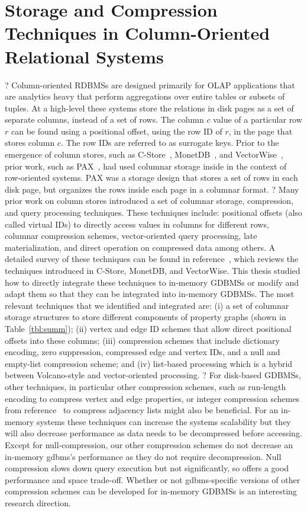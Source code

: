 \section{Storage and Compression Techniques in Column-Oriented Relational Systems}
\label{sec:column-stores-overview}
?
Column-oriented RDBMSs are designed primarily for OLAP applications that are analytics heavy that perform aggregations over entire tables or subsets of tuples. At a high-level these systems store the relations in disk pages as a set of separate columns, instead of a set of rows. The column $c$ value of a particular row $r$ can be found using a positional offset, using the row ID of $r$, in the page that stores column $c$. The row IDs are referred to as surrogate keys. Prior to the emergence of column stores, such as C-Store~\cite{c-store}, MonetDB~\cite{monet-2decades}, and VectorWise~\cite{boncz-vectorwise, boncz-vectorwise1},  prior work, such as PAX~\cite{pax}, had used columnar storage inside in the context of row-oriented systems. PAX was a storage design that stores a set of rows in each disk page, but organizes the rows inside each page in a columnar format. 
?
Many prior work on column stores introduced a set of columnar storage, compression, and query processing techniques. These techniques include: positional offsets (also called virtual IDs) to directly access values in columns for different rows, columnar compression schemes, vector-oriented query processing, late materialization, and direct operation on compressed data among others. A detailed survey of these techniques can be found in reference~\cite{design-imp-book}, which reviews the techniques introduced in C-Store, MonetDB, and VectorWise.  This thesis studied how to directly integrate these techniques to in-memory GDBMSs or modify and adapt them so that they can be integrated into in-memory GDBMSs. The most relevant techniques that we identified and integrated are:  (i) a set of columnar storage structures to store different components of property graphs (shown in Table~\ref{tbl:summ}); (ii) vertex and edge ID schemes that allow direct positional offsets into these columns; (iii) compression schemes that include dictionary encoding, zero suppression, compressed edge and vertex IDs, and a null and empty-list compression scheme;  and (iv) list-based processing which is a hybrid between Volcano-style and vector-oriented processing. 
?
For disk-based GDBMSs, other techniques, in particular other compression schemes, such as run-length encoding to compress vertex and edge properties, or integer compression schemes from reference~\cite{lemire:integer} to compress adjacency lists might also be beneficial. For an in-memory systems these techniques can increase the systems scalability but they will also decrease performance as data needs to be decompressed before accessing. Except for null-compression, our other compression schemes do not decrease an in-memory \gls{gdbms}'s performance as they do not require decompression. Null compression slows down query execution but not significantly, so offers a good performance and space trade-off. Whether or not \gls{gdbms}-specific versions of other compression schemes can be developed for in-memory GDBMSs is an interesting research direction.
